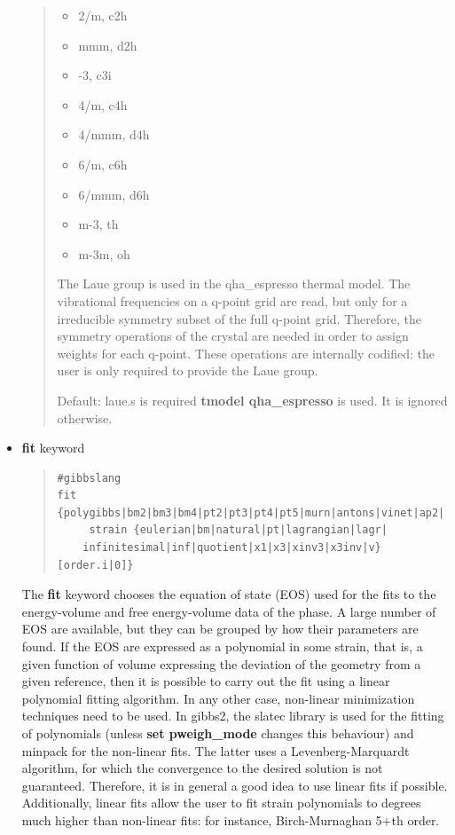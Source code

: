 \documentclass[a4paper]{article}
\begin{document}
\begin{itemize}
\begin{quote}
\begin{itemize}
\item 2/m, c2h

\item mmm, d2h

\item -3, c3i

\item 4/m, c4h

\item 4/mmm, d4h

\item 6/m, c6h

\item 6/mmm, d6h

\item m-3, th

\item m-3m, oh

\end{itemize}

The Laue group is used in the qha\_espresso thermal model. The
vibrational frequencies on a q-point grid are read, but only for a
irreducible symmetry subset of the full q-point grid. Therefore, the
symmetry operations of the crystal are needed in order to assign
weights for each q-point. These operations are internally codified:
the user is only required to provide the Laue group.

Default: laue.s is required \textbf{tmodel qha\_espresso} is used. It is
ignored otherwise.

\end{quote}

\item \textbf{fit} keyword
%
\begin{quote}
\begin{verbatim}
#gibbslang
fit {polygibbs|bm2|bm3|bm4|pt2|pt3|pt4|pt5|murn|antons|vinet|ap2|
     strain {eulerian|bm|natural|pt|lagrangian|lagr|
    infinitesimal|inf|quotient|x1|x3|xinv3|x3inv|v} [order.i|0]}
\end{verbatim}
\end{quote}

The \textbf{fit} keyword chooses the equation of state (EOS) used for
the fits to the energy-volume and free energy-volume data of the
phase. A large number of EOS are available, but they can be grouped
by how their parameters are found. If the EOS are expressed as a
polynomial in some strain, that is, a given function of volume
expressing the deviation of the geometry from a given reference,
then it is possible to carry out the fit using a linear polynomial
fitting algorithm. In any other case, non-linear minimization
techniques need to be used. In gibbs2, the slatec library is used
for the fitting of polynomials (unless \textbf{set pweigh\_mode} changes
this behaviour)  and minpack for the non-linear fits. The latter
uses a Levenberg-Marquardt algorithm, for which the convergence to
the desired solution is not guaranteed. Therefore, it is in general
a good idea to use linear fits if possible. Additionally, linear
fits allow the user to fit strain polynomials to degrees much
higher than non-linear fits: for instance, Birch-Murnaghan 5+th
order.


\end{itemize}
\end{document}
